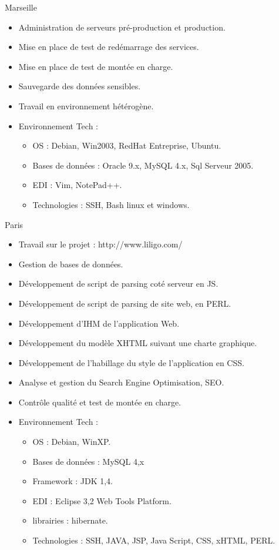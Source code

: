 \documentclass[10pt,a4paper,sans]{moderncv}
\begin{document}
{Marseille}{
  \begin{itemize}%
    \item Administration de serveurs pré-production et production.
    \item Mise en place de test de redémarrage des services.
    \item Mise en place de test de montée en charge.
    \item Sauvegarde des données sensibles.
    \item Travail en environnement hétérogène.
    \item Environnement Tech :
      \begin{itemize}%
        \item OS : Debian, Win2003, RedHat Entreprise, Ubuntu.
        \item Bases de données : Oracle 9.x, MySQL 4.x, Sql Serveur 2005.
        \item EDI : Vim, NotePad++.
        \item Technologies : SSH, Bash linux et windows.
      \end{itemize}
  \end{itemize}}

{Paris}{
  \begin{itemize}%
    \item Travail sur le projet : http://www.liligo.com/
    \item Gestion de bases de données.
    \item Développement de script de parsing coté serveur en JS.
    \item Développement de script de parsing de site web, en PERL.
    \item Développement d'IHM de l'application Web.
    \item Développement du modèle XHTML suivant une charte graphique.
    \item Développement de l’habillage du style de l'application en CSS.
    \item Analyse et gestion du Search Engine Optimisation, SEO.
    \item Contrôle qualité et test de montée en charge.
    \item Environnement Tech :
      \begin{itemize}%
        \item OS : Debian, WinXP.
        \item Bases de données : MySQL 4,x
        \item Framework : JDK 1,4.
        \item EDI : Eclipse 3,2 Web Tools Platform.
        \item librairies : hibernate.
        \item Technologies : SSH, JAVA, JSP, Java Script, CSS, xHTML, PERL.
      \end{itemize}
  \end{itemize}}
\end{document}
